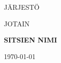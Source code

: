 \documentclass[8pt]{extbook}
\begin{document}
\begin{multicols}{2}
\raggedbottom
\begin{titlepage}
	\centering
	{\scshape\LARGE JÄRJESTÖ \par}
	\vspace{1cm}
	{\scshape\Large JOTAIN\par}
	\vspace{1.5cm}
	{\huge\bfseries SITSIEN NIMI\par}

	\vfill

	{\large \today\par}
\end{titlepage}
\small


\printindex

\end{multicols}
\end{document}
